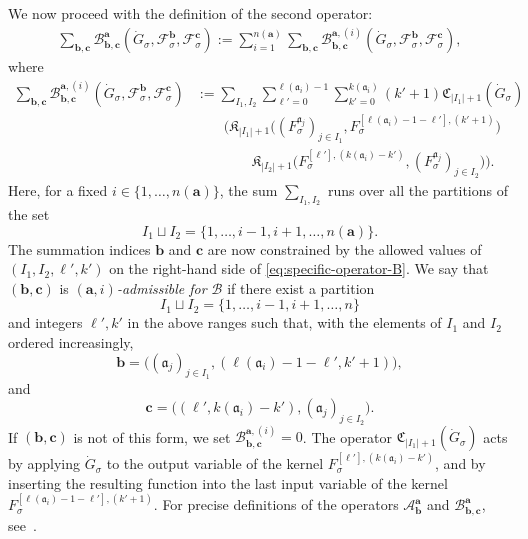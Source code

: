 \documentclass{article}
\numberwithin{equation}{section}
\newcommand{\assign}{:=}
\theoremstyle{plain}
\theoremstyle{definition}
\begin{document}
We now proceed with the definition of the second operator:
\begin{align*}
  \sum_{\boldsymbol{b}, \boldsymbol{c}}
  \mathcal{B}^{\boldsymbol{a}}_{\boldsymbol{b}, \boldsymbol{c}}
  (\dot{G}_{\sigma}, \mathcal{F}^{\boldsymbol{b}}_{\sigma},
  \mathcal{F}^{\boldsymbol{c}}_{\sigma})\assign \sum_{i = 1}^{n(\boldsymbol{a})}
  \sum_{\boldsymbol{b}, \boldsymbol{c}}
  \mathcal{B}^{\boldsymbol{a}, (i)}_{\boldsymbol{b}, \boldsymbol{c}}
  (\dot{G}_{\sigma}, \mathcal{F}^{\boldsymbol{b}}_{\sigma},
  \mathcal{F}^{\boldsymbol{c}}_{\sigma}),
\end{align*}
where
\begin{equation}
  \begin{aligned}
    \sum_{\boldsymbol{b}, \boldsymbol{c}}
    \mathcal{B}^{\boldsymbol{a}, (i)}_{\boldsymbol{b}, \boldsymbol{c}}
    (\dot{G}_{\sigma}, \mathcal{F}^{\boldsymbol{b}}_{\sigma},
    \mathcal{F}^{\boldsymbol{c}}_{\sigma})
    & \assign \sum_{I_1, I_2}
    \sum_{\ell' = 0}^{\ell(\mathfrak{a}_i) - 1}
    \sum^{k(\mathfrak{a}_i)}_{k' = 0} (k' + 1)
    \mathfrak{C}_{| I_1 | + 1}(\dot{G}_{\sigma})\\
    &\qquad \bigg(
    \mathfrak{K}_{| I_1 | + 1}
    \Big((F_{\sigma}^{\mathfrak{a}_j})_{j \in I_1},
    F^{[\ell(\mathfrak{a}_i) - 1 - \ell'],(k' + 1)}_{\sigma}\Big)\\
    &\qquad\qquad 
    \mathfrak{K}_{| I_2 | + 1}
    \Big(F_{\sigma}^{[\ell'],(k(\mathfrak{a}_i) - k')},
    (F_{\sigma}^{\mathfrak{a}_j})_{j \in I_2}\Big) \bigg).
  \end{aligned}
  \label{eq:specific-operator-B}
\end{equation}
Here, for a fixed $i \in \{ 1, \ldots, n (\boldsymbol{a}) \}$, the sum
$\sum_{I_1, I_2}$ runs over all the partitions of the set
\[ I_1 \sqcup I_2 = \{ 1, \ldots, i - 1, i + 1, \ldots, n (\boldsymbol{a}) \} .
\]
The summation indices $\boldsymbol{b}$ and $\boldsymbol{c}$ are now constrained by the allowed values of
$(I_1, I_2, \ell', k')$ on the right-hand side of
\eqref{eq:specific-operator-B}. 
We say that $(\boldsymbol b,\boldsymbol c)$ is
\emph{$(\boldsymbol a,i)$-admissible for $\mathcal B$} if there exist a
partition
\[
I_1\sqcup I_2=\{1,\ldots,i-1,i+1,\ldots,n\}
\]
and integers $\ell',k'$ in the above ranges such that, with the elements of
$I_1$ and $I_2$ ordered increasingly,
\[
\boldsymbol b =
\bigl((\mathfrak a_j)_{j\in I_1},
(\ell(\mathfrak a_i)-1-\ell',k'+1)\bigr),
\]
and
\[
\boldsymbol c =
\bigl((\ell',k(\mathfrak a_i)-k'),
(\mathfrak a_j)_{j\in I_2}\bigr).
\]
If $(\boldsymbol b,\boldsymbol c)$ is not of this form, we set
$\mathcal B^{\boldsymbol a,(i)}_{\boldsymbol b,\boldsymbol c}=0$.
The operator
$\mathfrak{C}_{| I_1 | + 1} (\dot{G}_{\sigma})$ acts by applying
$\dot{G}_{\sigma}$ to the output variable of the kernel $F_{\sigma}^{[\ell'],(k(\mathfrak a_i)-k')}$, and by
inserting the resulting function into the last input variable of the
kernel $F_{\sigma}^{[\ell(\mathfrak a_i)-1-\ell'],(k'+1)}$. For precise definitions of the operators
{\textsf{$\mathcal{A}^{\boldsymbol{a}}_{\boldsymbol{b}}$}} and
$\mathcal{B}^{\boldsymbol{a}}_{\boldsymbol{b}, \boldsymbol{c}}$,
see~{\cite{duchFlowEquationApproach2021}}.
\end{document}
